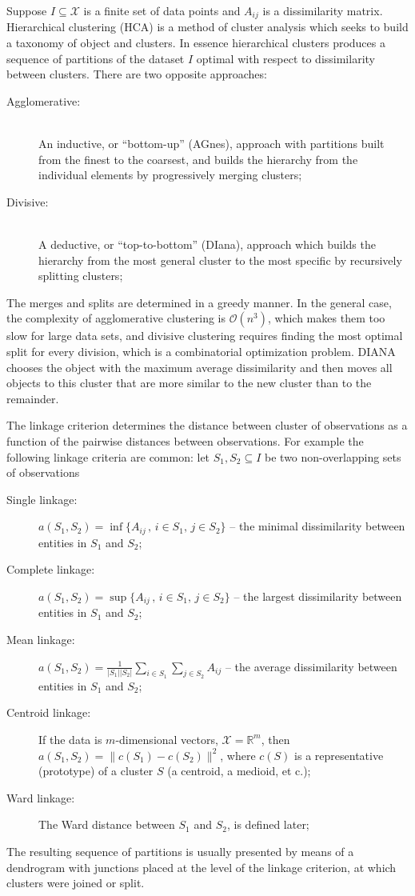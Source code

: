 \documentclass[a4paper,14pt]{extarticle}
\newcommand{\Xcal}{\mathcal{X}}
\newcommand{\Real}{\mathbb{R}}
\begin{document}
Suppose $I\subseteq \Xcal$ is a finite set of data points and $A_{ij}$ is a dissimilarity
matrix. Hierarchical clustering (HCA) is a method of cluster analysis which seeks
to build a taxonomy of object and clusters. In essence hierarchical clusters produces
a sequence of partitions of the dataset $I$ optimal with respect to dissimilarity
between clusters. There are two opposite approaches:\begin{description}
    \item[Agglomerative:] \hfill \\
        An inductive, or ``bottom-up'' (AGnes), approach with partitions built from
        the finest to the coarsest, and builds the hierarchy from the individual
        elements by progressively merging clusters;
    \item[Divisive:] \hfill \\
        A deductive, or ``top-to-bottom'' (DIana), approach which builds the hierarchy
        from the most general cluster to the most specific by recursively splitting
        clusters;
\end{description}
The merges and splits are determined in a greedy manner. In the general case, the
complexity of agglomerative clustering is $\mathcal{O}(n^3)$, which makes them too
slow for large data sets, and divisive clustering requires finding the most optimal
split for every division, which is a combinatorial optimization problem. DIANA chooses
the object with the maximum average dissimilarity and then moves all objects to this
cluster that are more similar to the new cluster than to the remainder. 

The linkage criterion determines the distance between cluster of observations as
a function of the pairwise distances between observations. For example the following
linkage criteria are common: let $S_1, S_2\subseteq I$ be two non-overlapping sets
of observations\begin{description}
    \item[Single linkage:]
        $a(S_1, S_2) = \inf\{A_{ij}\,,\, i\in S_1,\,j\in S_2\}$
        -- the minimal dissimilarity between entities in $S_1$ and $S_2$;
    \item[Complete linkage:]
        $a(S_1, S_2) = \sup\{ A_{ij}\,,\, i\in S_1,\,j\in S_2\}$
        -- the largest dissimilarity between entities in $S_1$ and $S_2$;
    \item[Mean linkage:]
        $a(S_1, S_2) = \frac{1}{|S_1||S_2|} \sum_{i\in S_1}\sum_{j\in S_2} A_{ij}$
        -- the average dissimilarity between entities in $S_1$ and $S_2$;
    \item[Centroid linkage:]
        If the data is $m$-dimensional vectors, $\mathcal{X} = \Real^m$,
        then $a(S_1,S_2) = \|c(S_1) - c(S_2)\|^2$, where $c(S)$ is a representative
        (prototype) of a cluster $S$ (a centroid, a medioid, et c.);
    \item[Ward linkage:]
        The Ward distance between $S_1$ and $S_2$, is defined later;
\end{description}
The resulting sequence of partitions is usually presented by means of a dendrogram
with junctions placed at the level of the linkage criterion, at which clusters were
joined or split.
\end{document}
